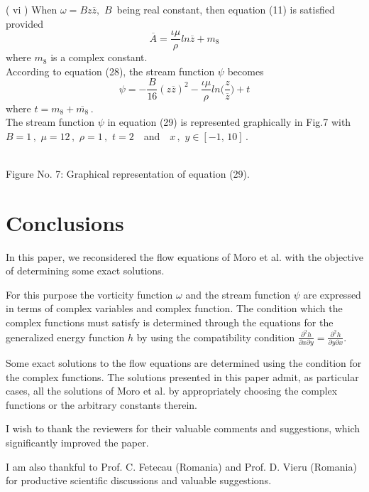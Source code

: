 \documentclass[twocolumn,showpacs,preprintnumbers,amsmath,amssymb]{revtex4}
\begin{document}
( vi )   When $\omega=Bz\overline{z},\,\,B$\, being real constant,
then equation (11) is satisfied provided
\begin{equation}
\overline{A}=\frac{\iota\mu}{\rho}ln\overline{z}+ m_{8}
\end{equation}
where $m_{8}$  is a complex constant.\\
According to equation (28), the stream function $\psi$  becomes
\begin{equation}
\psi=-\frac{B}{16}(z\overline{z})^{2}-\frac{\iota\mu}{\rho}ln\Big(\frac{z}{\overline{z}}\Big)
+ t
\end{equation}
where $ t = m_{8} + \overline{m_{8}}$\,.\\The stream function $\psi$
in equation (29) is represented graphically in Fig.7 with $ B = 1\,
,\,\, \mu = 12\, ,\,\, \rho = 1\, ,\,\, t = 2$ \,\, and \,\, $ x \,
,\,\, y \in [-1 ,\, 10]$\,.
\begin{center}
\\Figure No. 7: Graphical
representation of equation (29).
\end{center}
\section{Conclusions}

In this paper, we reconsidered the flow equations of Moro et al.
\cite{Moro} with the objective of determining some exact solutions.

For this purpose the vorticity function $\omega$  and the stream
function $\psi$  are expressed in terms of complex variables and
complex function. The condition which the complex functions must
satisfy is determined through the equations for the generalized
energy function $h$  by using the compatibility condition
$\frac{\partial^2 h}{\partial x
\partial y}= \frac{\partial^2 h}{\partial y \partial x}$.

Some exact solutions to the flow equations are determined using the
condition for the complex functions. The solutions presented in this
paper admit, as particular cases, all the solutions of Moro et al.
\cite{Moro} by appropriately choosing the complex functions or the
arbitrary constants therein.

\begin{acknowledgments}
I wish to thank the reviewers for their valuable comments and
suggestions, which significantly improved the paper.

I am also thankful to Prof. C. Fetecau (Romania) and Prof. D. Vieru
(Romania) for productive scientific discussions and valuable
suggestions.
\end{acknowledgments}
\end{document}
